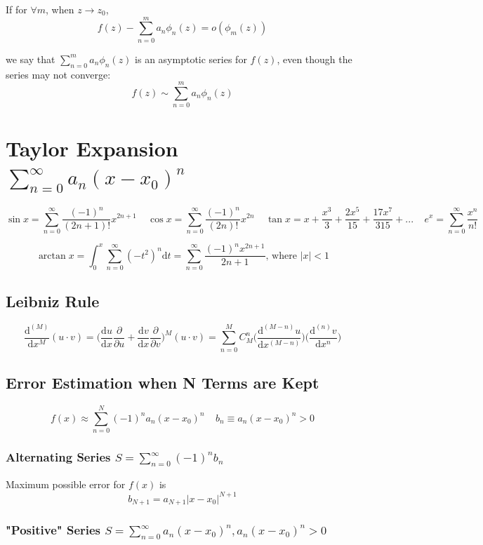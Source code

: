 \documentclass[10pt]{article}
\newcommand{\dd}{\mathrm{d}}
\begin{document}
If for $\forall m$, when $z\to z_0$,
$$
f(z) - \sum_{n=0}^m a_n \phi_n(z) = o(\phi_m(z))
$$

we say that $\sum_{n=0}^m a_n \phi_n(z)$ is an asymptotic series for $f(z)$, even though the series may not converge:
$$
f(z) \sim \sum_{n=0}^m a_n \phi_n(z)
$$

\section[Taylor Expansion]{Taylor Expansion $\sum_{n=0}^\infty a_n (x-x_0)^n$}
$$
\sin x = \sum_{n=0}^\infty \frac{(-1)^n}{(2n+1)!} x^{2n+1}\ \ \ \ \ \cos x = \sum_{n=0}^\infty \frac{(-1)^n}{(2n)!} x^{2n}\ \ \ \ \ \tan x = x + \frac{x^3}{3} + \frac{2x^5}{15} + \frac{17x^7}{315} + ...\ \ \ \ \ e^{x} = \sum_{n=0}^\infty \frac{x^n}{n!}
$$

$$
\arctan x = \int_0^x \sum_{n=0}^\infty (-t^2)^n \dd t = \sum_{n=0}^\infty \frac{(-1)^n x^{2n+1}}{2n+1} \text{, where } |x| < 1
$$

\subsection{Leibniz Rule}
$$
\frac{\dd^{(M)}}{\dd x^M} (u\cdot v) = \bigg(\frac{\dd u}{\dd x}\frac{\partial}{\partial u} + \frac{\dd v}{\dd x}\frac{\partial}{\partial v}\bigg)^M (u\cdot v) = \sum_{n=0}^M C_M^n \bigg(\frac{\dd^{(M-n)} u}{\dd x^{(M-n)}}\bigg) \bigg(\frac{\dd^{(n)} v}{\dd x^n}\bigg)
$$

\subsection{Error Estimation when N Terms are Kept}
$$
f(x) \approx \sum_{n=0}^N (-1)^n a_n (x-x_0)^n\ \ \ \ \ b_n \equiv a_n(x-x_0)^n > 0
$$

\subsubsection[Alternating Series]{Alternating Series $S = \sum_{n=0}^\infty (-1)^n b_n$}

Maximum possible error for $f(x)$ is
$$
b_{N+1} = a_{N+1} \big| x-x_0 \big|^{N+1}
$$

\subsubsection["Positive" Series]{"Positive" Series $S = \sum_{n=0}^\infty a_n (x-x_0)^n, a_n (x-x_0)^n > 0$}
\end{document}

